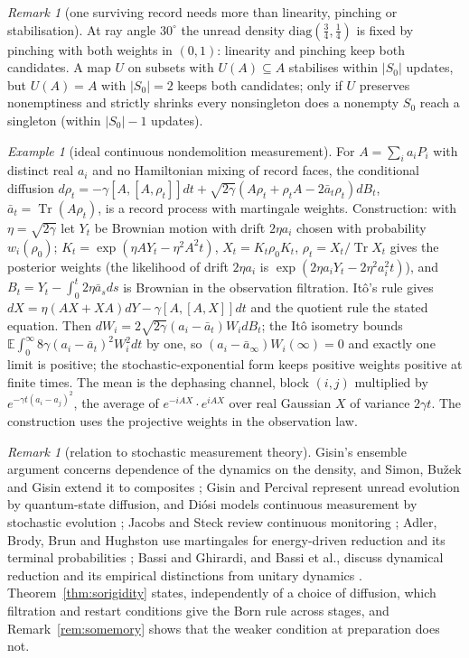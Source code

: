 \documentclass[aps,pra,onecolumn,superscriptaddress,nofootinbib,10pt]{revtex4-2}
\theoremstyle{definition}
\theoremstyle{remark}
\newtheorem{remark}[theorem]{Remark}
\newtheorem{example}[theorem]{Example}
\newcommand{\tr}{\operatorname{Tr}}
\begin{document}
\begin{remark}[one surviving record needs more than linearity, pinching or stabilisation]\label{rem:sononselection}
At ray angle $30^\circ$ the unread density $\mathrm{diag}(\tfrac34,\tfrac14)$ is fixed by pinching with both weights in $(0,1)$: linearity
and pinching keep both candidates.  A map $U$ on subsets with $U(A)\subseteq A$ stabilises within $\lvert S_0\rvert$ updates, but
$U(A)=A$ with $\lvert S_0\rvert=2$ keeps both candidates; only if $U$ preserves nonemptiness and strictly shrinks every
nonsingleton does a nonempty $S_0$ reach a singleton (within $\lvert S_0\rvert-1$ updates).
\end{remark}

\begin{example}[ideal continuous nondemolition measurement]\label{ex:sodiffusion}
For $A=\sum_ia_iP_i$ with distinct real $a_i$ and no Hamiltonian mixing of record faces, the conditional diffusion
$d\rho_t=-\gamma[A,[A,\rho_t]]dt+\sqrt{2\gamma}(A\rho_t+\rho_tA-2\bar a_t\rho_t)dB_t$, $\bar a_t=\tr(A\rho_t)$, is a record process with martingale weights.
Construction: with $\eta=\sqrt{2\gamma}$ let $Y_t$ be Brownian motion with drift $2\eta a_i$ chosen with probability $w_i(\rho_0)$;
$K_t=\exp(\eta AY_t-\eta^2A^2t)$, $X_t=K_t\rho_0K_t$, $\rho_t=X_t/\tr X_t$ gives the posterior weights (the likelihood of drift $2\eta a_i$
is $\exp(2\eta a_iY_t-2\eta^2a_i^2t)$), and $B_t=Y_t-\int_0^t2\eta\bar a_sds$ is Brownian in the observation filtration.  It\^o's rule gives
$dX=\eta(AX+XA)dY-\gamma[A,[A,X]]dt$ and the quotient rule the stated equation.  Then
$dW_i=2\sqrt{2\gamma}(a_i-\bar a_t)W_idB_t$; the It\^o isometry bounds $\mathbb E\int_0^\infty8\gamma(a_i-\bar a_t)^2W_i^2dt$ by one, so $(a_i-\bar a_\infty)W_i(\infty)=0$ and exactly
one limit is positive; the stochastic-exponential form keeps positive weights positive at finite times.
The mean is the dephasing channel, block $(i,j)$ multiplied by $e^{-\gamma t(a_i-a_j)^2}$, the average of $e^{-iAX}\cdot e^{iAX}$ over real
Gaussian $X$ of variance $2\gamma t$.  The construction uses the projective weights in the observation law.
\end{example}

\begin{remark}[relation to stochastic measurement theory]\label{rem:sohistory}
Gisin's ensemble argument concerns dependence of the dynamics on the density, and Simon, Bu\v{z}ek and
Gisin extend it to composites \cite{n3:Gisin,n3:Simon}; Gisin and Percival represent unread evolution by
quantum-state diffusion, and Di\'osi models continuous measurement by stochastic evolution
\cite{n3:GisinPercival,n3:Diosi}; Jacobs and Steck review continuous monitoring \cite{n3:Jacobs}; Adler,
Brody, Brun and Hughston use martingales for energy-driven reduction and its terminal probabilities
\cite{n3:Adler}; Bassi and Ghirardi, and Bassi et al., discuss dynamical reduction and its empirical
distinctions from unitary dynamics \cite{n3:BassiGhirardi,n3:Bassi}.  Theorem~\ref{thm:sorigidity} states, independently of a
choice of diffusion, which filtration and restart conditions give the Born rule across stages, and
Remark~\ref{rem:somemory} shows that the weaker condition at preparation does not.
\end{remark}
\end{document}
